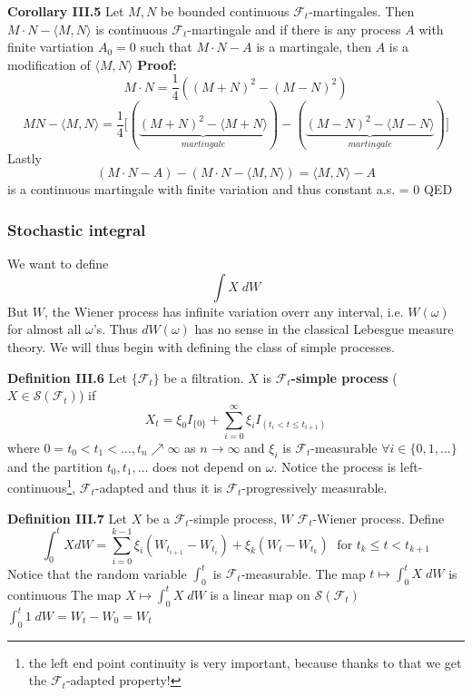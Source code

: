 \documentclass[english]{article}
\newcommand{\ub}{\underbrace}
\newcommand{\note}[1]{\noindent\textbf{#1}}
\newcommand{\F}{\mathcal F}
\begin{document}
 \note{Corollary III.5} Let $M,N$ be bounded continuous $\F_t$-martingales. Then $M\cdot N - \langle M, N\rangle$ is continuous $\F_t$-martingale and if there is any process $A$ with finite vartiation $A_0 = 0$ such that $M\cdot N - A$ is a martingale, then $A$ is a modification of $\langle M, N \rangle$ \newline
 \note{Proof:}
 $$M\cdot N = \frac 14 ((M+N)^2 - (M-N)^2)$$
 $$MN - \langle M,N\rangle = \frac 14 \Big[ (\ub{(M+N)^2 - \langle M+N \rangle}_{martingale} ) - (\ub{(M-N)^2 - \langle M-N\rangle }_{martingale})\Big]$$
Lastly
$$(M\cdot N - A) - (M\cdot N - \langle M, N \rangle ) = \langle M, N \rangle - A $$
is a continuous martingale with finite variation and thus constant a.s. = 0 \newline
QED 

\subsubsection*{Stochastic integral}
We want to define 
$$\int X \; dW$$
But $W$, the Wiener process has infinite variation overr any interval, i.e. $W(\omega)$ for almost all $\omega$'s. Thus $dW(\omega)$ has no sense in the classical Lebesgue measure theory. We will thus begin with defining the class of simple processes. \newline

\note{Definition III.6} Let $\{\F_t\}$ be a filtration. $X$ is $\F_t$\textbf{-simple process} ($X \in \mathcal S(\F_t)$) if
$$X_t = \xi_0 I_{\{0\}} + \sum^\infty_{i=0} \xi_i I_{(t_i < t \leq t_{i+1})}$$
where $0=t_0 < t_1 < \dots, t_n \nearrow \infty$ as $n\to \infty$ and $\xi_i$ is $\F_t$-measurable $\forall i \in \{0, 1,\dots \}$ and the partition $t_0, t_1,\dots$ does not depend on $\omega$. \newline
Notice the process is left-continuous\footnote{the left end point continuity is very important, because thanks to that we get the $\F_t$-adapted property!}, $\F_t$-adapted and thus it is $\F_t$-progressively measurable. \newline

\note{Definition III.7} Let $X$ be a $\F_t$-simple process, $W$ $\F_t$-Wiener process. Define
$$\int^t_0 X dW = \sum^{k-1}_{i=0} \xi_i (W_{t_{i+1}} - W_{t_i}) + \xi_k (W_t - W_{t_k}) \; \text{ for } t_k \leq t < t_{k+1}$$
Notice that the random variable $\int^t_0$ is $\F_t$-measurable. \newline
The map $t \mapsto \int^t_0 X \; dW$ is continuous \newline
The map $X \mapsto \int^t_0 X \; dW$ is a linear map on $\mathcal S(\F_t)$ \newline
$\int^t_0 1 \; dW = W_t - W_0 = W_t$ \newline
\end{document}
